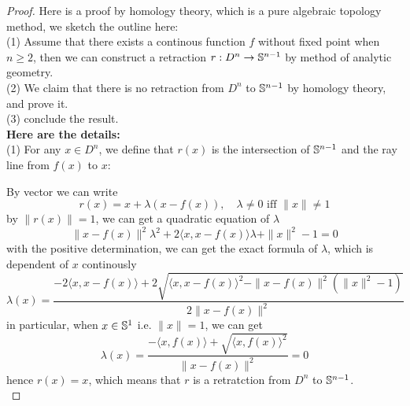 \begin{proof}
    Here is a proof by homology theory, which is a pure algebraic topology method, we sketch the outline here:\\
    (1) Assume that there exists a continous function \(f\) without fixed point when \(n\geq 2\), then we can construct a retraction \(r:D^n \to \mathbb{S}^{n-1}\) by method of analytic geometry.\\
    (2) We claim that there is no retraction from \(D^n\) to \(\mathbb{S}^{n-1}\) by homology theory, and prove it.\\
    (3) conclude the result.\\

    \textbf{Here are the details:}\\
    (1) For any \(x \in D^n\), we define that \(r(x)\) is the intersection of \(\mathbb{S}^{n-1}\) and the ray line from \(f(x)\) to \(x\):
      \begin{center}
    \end{center}
    By vector we can write
    \[r(x) = x + \lambda(x-f(x)), \quad \lambda \neq 0 \text{ iff } \|x\|\neq 1\]
    by \(\|r(x)\|=1\), we can get a quadratic equation of \(\lambda\)
    \[\|x-f(x)\|^2 \lambda^2 + 2\langle x, x-f(x) \rangle \lambda + \|x\|^2 - 1 = 0\]
    with the positive determination, we can get the exact formula of \(\lambda\), which is dependent of \(x\) continously
    \[\lambda(x) = \frac{-2\langle x, x-f(x)\rangle+2 \sqrt{\langle x, x-f(x) \rangle^2-\|x-f(x)\|^2(\|x\|^2-1)}}{2\|x-f(x)\|^2}\]
    in particular, when \(x \in \mathbb{S}^1\) i.e. \(\|x\|=1\), we can get
    \[\lambda(x) = \frac{-\langle x,f(x) \rangle +  \sqrt{\langle x,f(x) \rangle^2}}{\|x-f(x)\|^2} = 0\]
    hence \(r(x) = x\), which means that \(r\) is a retratction from \(D^n\) to \(\mathbb{S}^{n-1}\).\\


\end{proof}
